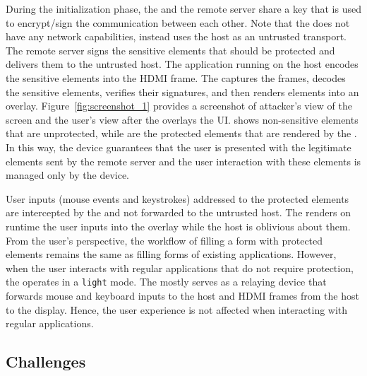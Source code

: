 During the initialization phase, the \device and the remote server share a key that is used to encrypt/sign the communication between each other. Note that the \device does not have any network capabilities, instead uses the host as an untrusted transport. The remote server signs the sensitive elements that should be protected and delivers them to the untrusted host. The application running on the host encodes the sensitive elements into the HDMI frame. The \device captures the frames, decodes the sensitive elements, verifies their signatures, and then renders elements into an overlay. Figure~\ref{fig:screenshot_1} provides a screenshot of attacker's view of the screen and the user's view after the \device overlays the UI. \one shows non-sensitive elements that are unprotected, while \two are the protected elements that are rendered by the \device. In this way, the device guarantees that the user is presented with the legitimate elements sent by the remote server and the user interaction with these elements is managed only by the device.
  
User inputs (mouse events and keystrokes) addressed to the protected elements are intercepted by the \device and not forwarded to the untrusted host. The \device renders on runtime the user inputs into the overlay while the host is oblivious about them. From the user's perspective, the workflow of filling a form with protected elements remains the same as filling forms of existing applications. However, when the user interacts with regular applications that do not require \name protection, the \device operates in a \texttt{light} mode. The \device mostly serves as a relaying device that forwards mouse and keyboard inputs to the host and HDMI frames from the host to the display. Hence, the user experience is not affected when interacting with regular applications. 


\subsection{Challenges}


